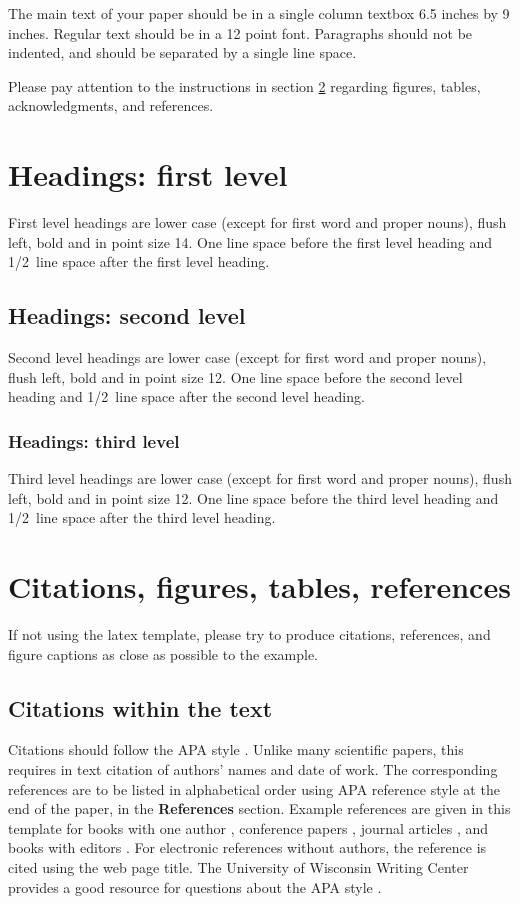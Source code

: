 \documentclass{article}
\begin{document}
The main text of your paper should be in a single column textbox 6.5
inches by 9 inches. Regular text should be in a 12 point font.
Paragraphs should not be indented, and should be separated by a
single line space.

Please pay attention to the instructions in section \ref{others}
regarding figures, tables, acknowledgments, and references.

\section{Headings: first level}
\label{headings}

First level headings are lower case (except for first word and
proper nouns), flush left, bold and in point size 14. One line space
before the first level heading and 1/2~line space after the first
level heading.

\subsection{Headings: second level}

Second level headings are lower case (except for first word and
proper nouns), flush left, bold and in point size 12. One line space
before the second level heading and 1/2~line space after the second
level heading.

\subsubsection{Headings: third level}

Third level headings are lower case (except for first word and
proper nouns), flush left, bold and in point size 12. One line space
before the third level heading and 1/2~line space after the third
level heading.

\section{Citations, figures, tables, references}
\label{others}

If not using the  latex template, please try to produce citations,
references, and figure captions as close as possible to the example.

\subsection{Citations within the text}

Citations should follow the APA style \cite{apa}. Unlike many
scientific papers, this requires in text citation of authors' names
and date of work. The corresponding references are to be listed in
alphabetical order using APA reference style at the end of the
paper, in the \textbf{References} section. Example references are
given in this template for books with one author \cite{baxter},
conference papers \cite{binh}, journal articles \cite{baldwin}, and
books with editors \cite{stock}. For electronic references without
authors, the reference is cited using the web page title. The
University of Wisconsin Writing Center provides a good resource for
questions about the APA style \cite{wisconsin}.
\end{document}
